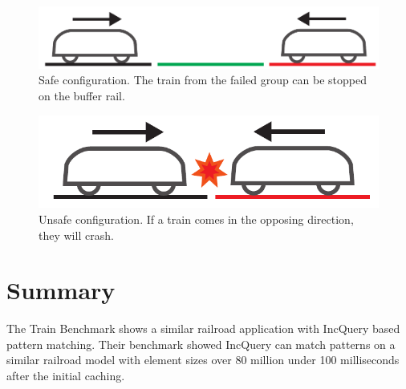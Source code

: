 \newpage
\begin{figure}[H]
	\centering
	\includegraphics[width=0.7\linewidth]{include/figures/chapter_6/failsafe/safe}
	\caption{Safe configuration. The train from the failed group can be stopped on the buffer rail.}
	\label{fig:case_study:safe}
\end{figure}

\begin{figure}[H]
	\centering
	\includegraphics[width=0.5\linewidth]{include/figures/chapter_6/failsafe/unsafe}
	\caption{Unsafe configuration. If a train comes in the opposing direction, they will crash.}
	\label{fig:case_study:unsafe}
\end{figure}

\section{Summary}

The Train Benchmark\cite{TrainBenchmark} shows a similar railroad application with IncQuery based pattern matching. Their benchmark showed IncQuery can match patterns on a similar railroad model with element sizes over 80 million under 100 milliseconds after the initial caching.
